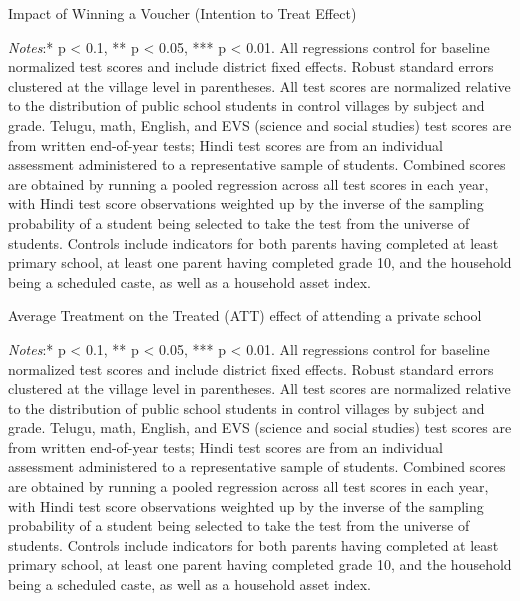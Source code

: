 \documentclass[hidelinks, 12pt, titlepage]{article}
\begin{document}
\begin{table}[htbp]
\begin{threeparttable}
\centering
\caption{Impact of Winning a Voucher (Intention to Treat Effect)\label{table:appendixacademics}}

\begin{tablenotes}
\item \emph{Notes}:* p < 0.1, ** p < 0.05, *** p < 0.01. All regressions control for baseline normalized test scores and include district fixed effects. Robust standard errors clustered at the village level in parentheses.  All test scores are normalized relative to the distribution of public school students in control villages by subject and grade. Telugu, math, English, and EVS (science and social studies) test scores are from written end-of-year tests; Hindi test scores are from an individual assessment administered to a representative sample of students. Combined scores are obtained by running a pooled regression across all test scores in each year, with Hindi test score observations weighted up by the inverse of the sampling probability of a student being selected to take the test from the universe of students. Controls include indicators for both parents having completed at least primary school, at least one parent having completed grade 10, and the household being a scheduled caste, as well as a household asset index.
\end{tablenotes}
\end{threeparttable}
\end{table}

\begin{table}[htbp]
\begin{threeparttable}
\centering
\caption{Average Treatment on the Treated (ATT) effect of attending a private school\label{table:appendixacademicsinstrumented}}

\begin{tablenotes}
\item \emph{Notes}:* p < 0.1, ** p < 0.05, *** p < 0.01. All regressions control for baseline normalized test scores and include district fixed effects. Robust standard errors clustered at the village level in parentheses.  All test scores are normalized relative to the distribution of public school students in control villages by subject and grade. Telugu, math, English, and EVS (science and social studies) test scores are from written end-of-year tests; Hindi test scores are from an individual assessment administered to a representative sample of students. Combined scores are obtained by running a pooled regression across all test scores in each year, with Hindi test score observations weighted up by the inverse of the sampling probability of a student being selected to take the test from the universe of students. Controls include indicators for both parents having completed at least primary school, at least one parent having completed grade 10, and the household being a scheduled caste, as well as a household asset index.
\end{tablenotes}
\end{threeparttable}
\end{table}
\end{document}
